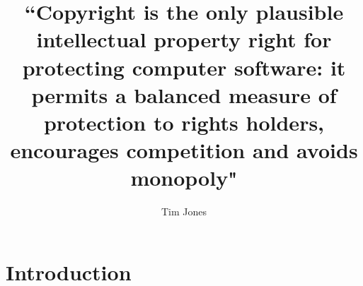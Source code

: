 \documentclass[notitlepage]{article}
\title{``Copyright is the only plausible intellectual property right for protecting computer 
software: it permits a balanced measure of protection to rights holders, encourages 
competition and avoids monopoly"}
\author{Tim Jones }
\begin{document}
\maketitle

\section{Introduction}








\clearpage
{}

\end{document}
